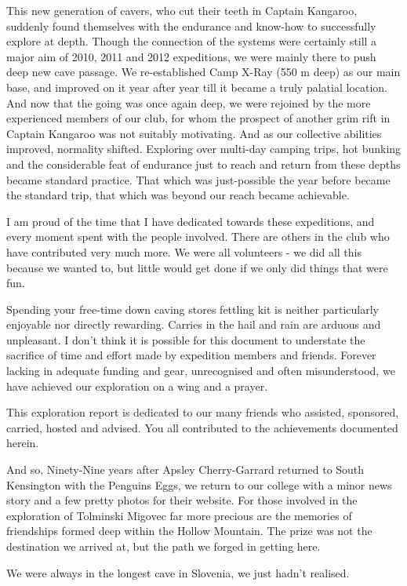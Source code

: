 This new generation of cavers, who cut their teeth in Captain Kangaroo,
suddenly found themselves with the endurance and know-how to
successfully explore at depth. Though the connection of the systems were
certainly still a major aim of 2010, 2011 and 2012 expeditions, we were
mainly there to push deep new cave passage. We re-established Camp X-Ray
(550 m deep) as our main base, and improved on it year after year till
it became a truly palatial location. And now that the going was once
again deep, we were rejoined by the more experienced members of our
club, for whom the prospect of another grim rift in Captain Kangaroo was
not suitably motivating. And as our collective abilities improved,
normality shifted. Exploring over multi-day camping trips, hot bunking
and the considerable feat of endurance just to reach and return from
these depths became standard practice. That which was just-possible the
year before became the standard trip, that which was beyond our reach
became achievable.

I am proud of the time that I have dedicated towards these expeditions,
and every moment spent with the people involved. There are others in the
club who have contributed very much more. We were all volunteers - we
did all this because we wanted to, but little would get done if we only
did things that were fun.

Spending your free-time down caving stores fettling kit is neither
particularly enjoyable nor directly rewarding. Carries in the hail and
rain are arduous and unpleasant. I don't think it is possible for this
document to understate the sacrifice of time and effort made by
expedition members and friends. Forever lacking in adequate funding and
gear, unrecognised and often misunderstood, we have achieved our
exploration on a wing and a prayer.

This exploration report is dedicated to our many friends who assisted,
sponsored, carried, hosted and advised. You all contributed to the
achievements documented herein.

And so, Ninety-Nine years after Apsley Cherry-Garrard returned to South
Kensington with the Penguins Eggs, we return to our college with a minor
news story and a few pretty photos for their website. For those involved
in the exploration of Tolminski Migovec far more precious are the
memories of friendships formed deep within the Hollow Mountain. The
prize was not the destination we arrived at, but the path we forged in
getting here.

We were always in the longest cave in Slovenia, we just hadn't realised.

